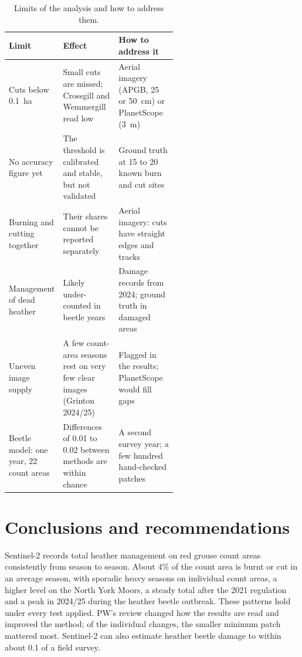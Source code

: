 \documentclass[11pt,a4paper]{article}
\begin{document}
\begin{table}[H]
\centering
\caption{Limits of the analysis and how to address them.}\label{tab:limits}
\footnotesize
\begin{tabularx}{\linewidth}{>{\raggedright\arraybackslash}p{0.24\linewidth}>{\raggedright\arraybackslash}p{0.33\linewidth}L}
\toprule
Limit & Effect & How to address it \\
\midrule
Cuts below 0.1~ha & Small cuts are missed; Crossgill and Wemmergill read low & Aerial imagery (APGB, 25 or 50~cm) or PlanetScope (3~m) \\
No accuracy figure yet & The threshold is calibrated and stable, but not validated & Ground truth at 15 to 20 known burn and cut sites \\
Burning and cutting together & Their shares cannot be reported separately & Aerial imagery: cuts have straight edges and tracks \\
Management of dead heather & Likely under-counted in beetle years & Damage records from 2024; ground truth in damaged areas \\
Uneven image supply & A few count-area seasons rest on very few clear images (Grinton 2024/25) & Flagged in the results; PlanetScope would fill gaps \\
Beetle model: one year, 22 count areas & Differences of 0.01 to 0.02 between methods are within chance & A second survey year; a few hundred hand-checked patches \\
\bottomrule
\end{tabularx}
\end{table}

\section{Conclusions and recommendations}\label{sec:conclusions}

Sentinel-2 records total heather management on red grouse count areas consistently from season to season. About 4\% of the count area is burnt or cut in an average season, with sporadic heavy seasons on individual count areas, a higher level on the North York Moors, a steady total after the 2021 regulation and a peak in 2024/25 during the heather beetle outbreak. These patterns hold under every test applied. PW's review changed how the results are read and improved the method; of the individual changes, the smaller minimum patch mattered most. Sentinel-2 can also estimate heather beetle damage to within about 0.1 of a field survey.
\end{document}
